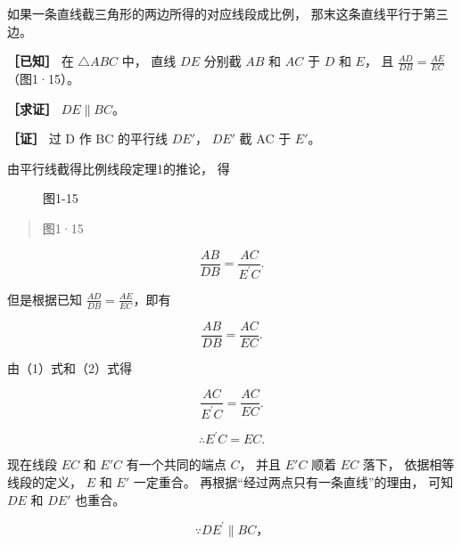 如果一条直线截三角形的两边所得的对应线段成比例，
那末这条直线平行于第三边。

\textbf{［已知］} 在 \(\triangle ABC\) 中， 直线 \(DE\) 分别截 \(AB\) 和
\(AC\) 于 \(D\) 和 \(E\)， 且 \(\frac{AD}{DB} = \frac{AE}{EC}\)
（图1·15）。

\textbf{［求证］} \(DE \parallel BC\)。

\textbf{［证］} 过 D 作 BC 的平行线 \(DE'\)， \(DE'\) 截 AC 于 \(E'\)。

由平行线截得比例线段定理1的推论， 得

\begin{figure}
\centering
{}
\caption{图1-15}
\end{figure}

\begin{quote}
图1·15
\end{quote}

\[
\frac {A B}{D B} = \frac {A C}{E ^ {\prime} C}. \tag {1}
\]

但是根据已知 \(\frac{AD}{DB} = \frac{AE}{EC}\)，即有

\[
\frac {A B}{D B} = \frac {A C}{E C}. \tag {2}
\]

由（1）式和（2）式得

\[
\frac {A C}{E ^ {\prime} C} = \frac {A C}{E C}.
\]

\[
\therefore E ^ {\prime} C = E C.
\]

现在线段 \(EC\) 和 \(E'C\) 有一个共同的端点 \(C\)， 并且 \(E'C\) 顺着
\(EC\) 落下， 依据相等线段的定义， \(E\) 和 \(E'\) 一定重合。
再根据``经过两点只有一条直线''的理由， 可知 \(DE\) 和 \(DE'\) 也重合。

\[
\because D E ^ {\prime} \parallel B C\text{，}
\]

